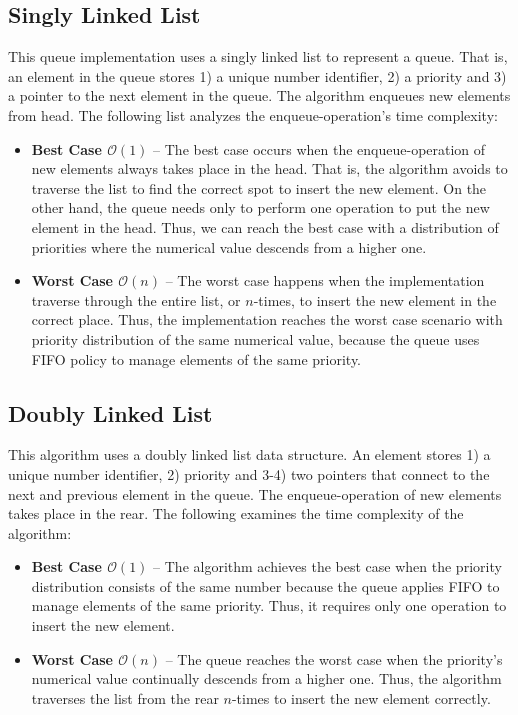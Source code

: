 \documentclass[a4paper,11pt]{kth-mag}
\begin{document}
\subsection{Singly Linked List}\label{sec:singly}
This queue implementation uses a singly linked list to represent a queue.
That is, an element in the queue stores 1) a unique number identifier, 2) a priority and 3) a pointer to the next element in the queue.
The algorithm enqueues new elements from head.
The following list analyzes the enqueue-operation's time complexity:
\begin{itemize}
    \item \textbf{Best Case $\mathcal{O}(1)$} --
        The best case occurs when the enqueue-operation of new elements always takes place in the head.
        That is, the algorithm avoids to traverse the list to find the correct spot to insert the new element.
        On the other hand, the queue needs only to perform one operation to put the new element in the head.
        Thus, we can reach the best case with a distribution of priorities where the numerical value descends from a higher one.
    \item \textbf{Worst Case $\mathcal{O}(n)$} --
        The worst case happens when the implementation traverse through the entire list, or $n$-times, to insert the new element in the correct place.
        Thus, the implementation reaches the worst case scenario with priority distribution of the same numerical value, because the queue uses FIFO policy to manage elements of the same priority.
\end{itemize}

\subsection{Doubly Linked List}
This algorithm uses a doubly linked list data structure.
An element stores 1) a unique number identifier, 2) priority and 3-4) two pointers that connect to the next and previous element in the queue.
The enqueue-operation of new elements takes place in the rear.
The following examines the time complexity of the algorithm:
\begin{itemize}
    \item \textbf{Best Case $\mathcal{O}(1)$} --
        The algorithm achieves the best case when the priority distribution consists of the same number because the queue applies FIFO to manage elements of the same priority.
        Thus, it requires only one operation to insert the new element.
    \item \textbf{Worst Case $\mathcal{O}(n)$} --
        The queue reaches the worst case when the priority's numerical value continually descends from a higher one.
        Thus, the algorithm traverses the list from the rear $n$-times to insert the new element correctly.
\end{itemize}
\end{document}
